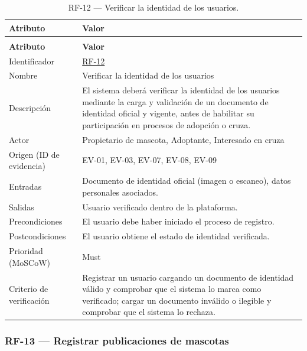 \documentclass[journal,onecolumn]{IEEEtran}
\makeatletter
\newenvironment{atributos}[2]{%
	\small
	\begin{longtable}{@{}>{\raggedright\arraybackslash}p{4.2cm} >{\raggedright\arraybackslash}p{11.2cm}@{}}
		\caption{#2}\label{tab:#1}\\
		\toprule
		\textbf{Atributo} & \textbf{Valor} \\
		\midrule
		\endfirsthead
		\multicolumn{2}{@{}l}{\small\itshape (continuación)}\\
		\toprule
		\textbf{Atributo} & \textbf{Valor} \\
		\midrule
		\endhead
		\bottomrule
		\endlastfoot
	}{%
	\end{longtable}
	\normalsize
}
\makeatother
\begin{document}
	\begin{atributos}{RF-12}{RF-12 --- Verificar la identidad de los usuarios.}
		Identificador & \hyperref[tab:RF-12]{RF-12} \\
		Nombre & Verificar la identidad de los usuarios \\
		Descripción & El sistema deberá verificar la identidad de los usuarios mediante la carga y validación de un documento de identidad oficial y vigente, antes de habilitar su participación en procesos de adopción o cruza. \\
		Actor & Propietario de mascota, Adoptante, Interesado en cruza \\
		Origen (ID de evidencia) & EV-01, EV-03, EV-07, EV-08, EV-09 \\
		Entradas & Documento de identidad oficial (imagen o escaneo), datos personales asociados. \\
		Salidas & Usuario verificado dentro de la plataforma. \\
		Precondiciones & El usuario debe haber iniciado el proceso de registro. \\
		Postcondiciones & El usuario obtiene el estado de identidad verificada. \\
		Prioridad (MoSCoW) & Must \\
		Criterio de verificación & Registrar un usuario cargando un documento de identidad válido y comprobar que el sistema lo marca como verificado; cargar un documento inválido o ilegible y comprobar que el sistema lo rechaza. \\
	\end{atributos}
	
	\subsubsection{RF-13 --- Registrar publicaciones de mascotas}
	
\end{document}

